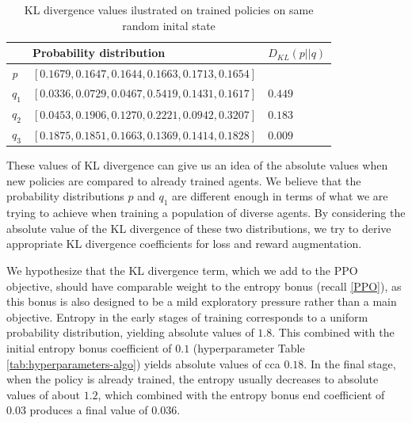 \begin{table}[htbp]
    \small
    \centering
    \begin{tabular}{lll}
      \toprule
      \                                & Probability distribution     & $D_{KL}(p||q)$         \\ \midrule
      \textit{p}     &$[0.1679, 0.1647, 0.1644, 0.1663, 0.1713, 0.1654]$                                   &                                   \\ \midrule            
      $q_1$                     & $[0.0336, 0.0729, 0.0467, 0.5419, 0.1431, 0.1617]$                            & $0.449$                            \\
      $q_2$                         & $[0.0453, 0.1906, 0.1270, 0.2221, 0.0942, 0.3207]$                            & $0.183$                            \\
      $q_3$                                & $[0.1875, 0.1851, 0.1663, 0.1369, 0.1414, 0.1828]$                         & $0.009$                               \\
      
     \bottomrule
    \end{tabular}
    \caption{KL divergence values ilustrated on trained policies on same random inital state}
    \label{tab:KLDiv-distributions}
\end{table}

These values of KL divergence can give us an idea of the absolute values when new policies are compared to already trained agents.
We believe that the probability distributions $p$ and $q_1$ are different enough in terms of what we are trying to achieve when training a population of diverse agents.
By considering the absolute value of the KL divergence of these two distributions, we try to derive appropriate KL divergence coefficients for loss and reward augmentation.

We hypothesize that the KL divergence term, which we add to the PPO objective, should have comparable weight to the entropy bonus (recall \ref{PPO}), as this bonus is also designed to be a mild exploratory pressure rather than a main objective.
Entropy in the early stages of training corresponds to a uniform probability distribution, yielding absolute values of $1.8$. 
This combined with the initial entropy bonus coefficient of $0.1$ (hyperparameter Table \ref{tab:hyperparameters-algo}) yields absolute values of cca $0.18$.
In the final stage, when the policy is already trained, the entropy usually decreases to absolute values of about $1.2$, which combined with the entropy bonus end coefficient of $0.03$ produces a final value of $0.036$.

